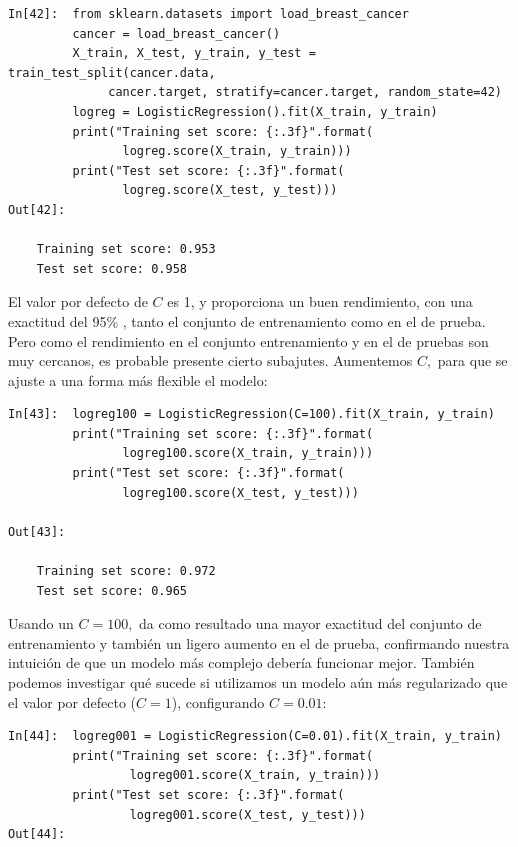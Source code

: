 {\begin{lstlisting}
In[42]:  from sklearn.datasets import load_breast_cancer
         cancer = load_breast_cancer()
         X_train, X_test, y_train, y_test = train_test_split(cancer.data, 
              cancer.target, stratify=cancer.target, random_state=42)
         logreg = LogisticRegression().fit(X_train, y_train)
         print("Training set score: {:.3f}".format(
                logreg.score(X_train, y_train)))
         print("Test set score: {:.3f}".format(
                logreg.score(X_test, y_test)))
Out[42]:

    Training set score: 0.953
    Test set score: 0.958
\end{lstlisting}


El valor por defecto de $C$ es 1, y proporciona un buen rendimiento, con una exactitud del 95\% , tanto el conjunto de entrenamiento como en el de prueba. Pero como el rendimiento en el  conjunto entrenamiento y en el de pruebas son muy cercanos, es probable presente cierto  subajutes.  Aumentemos $C,$ para que se ajuste a una forma más flexible el modelo:\\


\begin{lstlisting}
In[43]:  logreg100 = LogisticRegression(C=100).fit(X_train, y_train)
         print("Training set score: {:.3f}".format(
                logreg100.score(X_train, y_train)))
         print("Test set score: {:.3f}".format(
                logreg100.score(X_test, y_test)))

Out[43]:

    Training set score: 0.972
    Test set score: 0.965
\end{lstlisting}

Usando un $C = 100,$ da como resultado una mayor exactitud del conjunto de entrenamiento y también un  ligero aumento en el de prueba,  confirmando nuestra intuición de que un modelo más complejo debería funcionar mejor. También podemos investigar qué sucede si utilizamos un modelo aún más regularizado que
el valor por defecto ($ C = 1$), configurando $C = 0.01$: \\

\begin{lstlisting}
In[44]:  logreg001 = LogisticRegression(C=0.01).fit(X_train, y_train)
         print("Training set score: {:.3f}".format(
                 logreg001.score(X_train, y_train)))
         print("Test set score: {:.3f}".format(
                 logreg001.score(X_test, y_test)))
Out[44]:


\end{lstlisting}}
